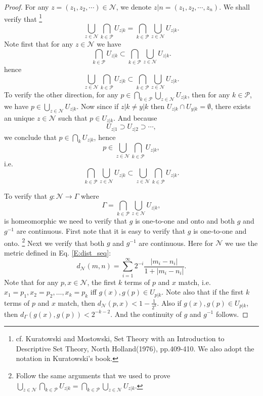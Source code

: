 \begin{proof}
For any $z=(z_1,z_2,\cdots)\in \mathcal{N}$, we denote 
$z|n=(z_1,z_2,\cdots,z_n)$. We shall verify that
\footnote{cf. Kuratowski and Mostowski, Set Theory with an Introduction to
Descriptive Set Theory, North Holland(1976), pp.409-410. We also adopt the 
notation in Kuratowski's book.}
\[
	\bigcup_{z\in\mathcal{N}} \bigcap_{k\in\mathcal{P}} U_{z|k}
	  =\bigcap_{k\in\mathcal{P}} \bigcup_{z\in\mathcal{N}} U_{z|k}.
\]
Note first that for any $z\in\mathcal{N}$ we have
\[
	\bigcap_{k\in\mathcal{P}} U_{z|k}
	  \subset\bigcap_{k\in\mathcal{P}} \bigcup_{z\in\mathcal{N}} U_{z|k}.
\]
hence
\[
	\bigcup_{z\in\mathcal{N}} \bigcap_{k\in\mathcal{P}} U_{z|k}
	  \subset\bigcap_{k\in\mathcal{P}} \bigcup_{z\in\mathcal{N}} U_{z|k}.
\]
To verify the other direction, for any 
$p\in\bigcap_{k\in\mathcal{P}} \bigcup_{z\in\mathcal{N}} U_{z|k}$, then
for any $k\in\mathcal{P}$, we have $p\in\bigcup_{z\in\mathcal{N}} U_{z|k}$.
Now since if $z|k\neq y|k$ then $U_{z|k}\cap U_{y|k}=\emptyset$, there exists
an unique $z\in\mathcal{N}$ such that $p\in U_{z|k}$. And because
\[
	U_{z|1} \supset U_{z|2} \supset \cdots,
\]
we conclude that $p\in\bigcap_k U_{z|k}$, hence
\[
	p\in\bigcup_{z\in\mathcal{N}} \bigcap_{k\in\mathcal{P}} U_{z|k},
\]
i.e.
\[
	\bigcap_{k\in\mathcal{P}} \bigcup_{z\in\mathcal{N}} U_{z|k}
	  \subset\bigcup_{z\in\mathcal{N}} \bigcap_{k\in\mathcal{P}} U_{z|k}.
\]

To verify that $g:\mathcal{N}\to \Gamma$ where
\[
	\Gamma=\bigcap_{k\in\mathcal{P}} \bigcup_{z\in\mathcal{N}} U_{z|k},
\]
is homeomorphic we need to verify that $g$ is one-to-one and onto and
both $g$ and $g^{-1}$ are continuous. 
First note that it is easy to verify that $g$ is one-to-one and onto.
\footnote{Follow the same arguments that we used to prove
$\bigcup_{z\in\mathcal{N}} \bigcap_{k\in\mathcal{P}} U_{z|k}
		=\bigcap_{k\in\mathcal{P}} \bigcup_{z\in\mathcal{N}} U_{z|k}$.}
Next we verify that both $g$ and $g^{-1}$ are continuous.
Here for $\mathcal{N}$ we use the metric defined in Eq. \ref{E:dist_seq}:
\[
	d_{\mathcal{N}}(m,n) 
	  = \sum_{i=1}^{\infty} 2^{-i} \frac{|m_i-n_i|}{1+|m_i-n_i|}.
\]
Note that for any $p,x\in\mathcal{N}$, the first $k$ terms of $p$ and $x$ 
match, i.e. $x_1=p_1,x_2=p_2, \dots, x_k=p_k$
iff $g(x),g(p)\in U_{p|k}$. Note also that if the first $k$ terms of $p$ and $x$
match, then $d_{\mathcal{N}}(p,x) < 1-\frac{1}{2^k}$. Also if 
$g(x),g(p)\in U_{p|k}$, then $d_{\Gamma}(g(x),g(p)) < 2^{-k-2}$. And the
continuity of $g$ and $g^{-1}$ follows.



\end{proof}
